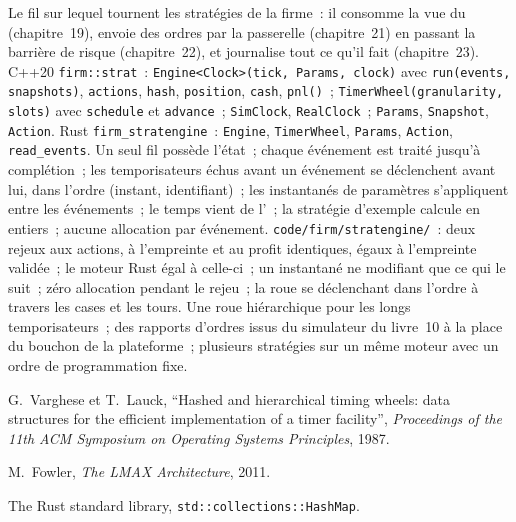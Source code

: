\begin{build}
 Le fil sur lequel tournent les stratégies de la firme~: il consomme la vue du  (chapitre~19), envoie des ordres
par la passerelle (chapitre~21) en passant la barrière de risque (chapitre~22), et journalise tout ce qu'il fait (chapitre~23).
 C++20 \texttt{firm::strat}~: \texttt{Engine<Clock>(tick, Params, clock)} avec \texttt{run(events, snapshots)},
\texttt{actions}, \texttt{hash}, \texttt{position}, \texttt{cash}, \texttt{pnl()}~; \texttt{TimerWheel(granularity, slots)} avec
\texttt{schedule} et \texttt{advance}~; \texttt{SimClock}, \texttt{RealClock}~; \texttt{Params}, \texttt{Snapshot},
\texttt{Action}. Rust \texttt{firm\_stratengine}~: \texttt{Engine}, \texttt{TimerWheel}, \texttt{Params}, \texttt{Action},
\texttt{read\_events}.
 Un seul fil possède l'état~; chaque événement est traité jusqu'à complétion~; les temporisateurs échus avant un événement se déclenchent avant lui, dans l'ordre (instant,
identifiant)~; les instantanés de paramètres s'appliquent entre les événements~; le temps vient de l'~; la stratégie d'exemple calcule
en entiers~; aucune allocation par événement.
 \texttt{code/firm/stratengine/}~: deux rejeux aux actions, à l'empreinte et au profit identiques, égaux
à l'empreinte validée~; le moteur Rust égal à celle-ci~; un instantané ne modifiant que ce qui le suit~; zéro allocation pendant le rejeu~; la
roue se déclenchant dans l'ordre à travers les cases et les tours.
 Une roue hiérarchique pour les longs temporisateurs~; des rapports d'ordres issus du simulateur du livre~10 à la place du
bouchon de la plateforme~; plusieurs stratégies sur un même moteur avec un ordre de programmation fixe.
\end{build}

\begin{omsources}
\item G.~Varghese et T.~Lauck, ``Hashed and hierarchical timing wheels: data structures for the efficient implementation of a
timer facility'', \emph{Proceedings of the 11th ACM Symposium on Operating Systems Principles}, 1987.
\item M.~Fowler, \emph{The LMAX Architecture}, 2011.
\item The Rust standard library, \texttt{std::collections::HashMap}.
\end{omsources}

